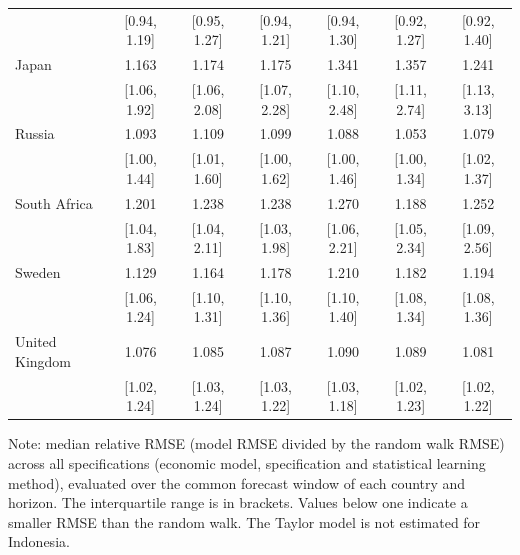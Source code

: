 \begin{table}[htbp]
{\begin{tabular*}{\textwidth}{@{\extracolsep{\fill}}lcccccc}
 & [0.94, 1.19] & [0.95, 1.27] & [0.94, 1.21] & [0.94, 1.30] & [0.92, 1.27] & [0.92, 1.40] \\
\addlinespace
Japan & 1.163 & 1.174 & 1.175 & 1.341 & 1.357 & 1.241 \\
 & [1.06, 1.92] & [1.06, 2.08] & [1.07, 2.28] & [1.10, 2.48] & [1.11, 2.74] & [1.13, 3.13] \\
\addlinespace
Russia & 1.093 & 1.109 & 1.099 & 1.088 & 1.053 & 1.079 \\
 & [1.00, 1.44] & [1.01, 1.60] & [1.00, 1.62] & [1.00, 1.46] & [1.00, 1.34] & [1.02, 1.37] \\
\addlinespace
South Africa & 1.201 & 1.238 & 1.238 & 1.270 & 1.188 & 1.252 \\
 & [1.04, 1.83] & [1.04, 2.11] & [1.03, 1.98] & [1.06, 2.21] & [1.05, 2.34] & [1.09, 2.56] \\
\addlinespace
Sweden & 1.129 & 1.164 & 1.178 & 1.210 & 1.182 & 1.194 \\
 & [1.06, 1.24] & [1.10, 1.31] & [1.10, 1.36] & [1.10, 1.40] & [1.08, 1.34] & [1.08, 1.36] \\
\addlinespace
United Kingdom & 1.076 & 1.085 & 1.087 & 1.090 & 1.089 & 1.081 \\
 & [1.02, 1.24] & [1.03, 1.24] & [1.03, 1.22] & [1.03, 1.18] & [1.02, 1.23] & [1.02, 1.22] \\
\bottomrule
\end{tabular*}
}
\par\noindent\begin{minipage}{\textwidth}
{\fontsize{8}{10}\selectfont Note: median relative RMSE (model RMSE divided by the random walk RMSE) across all specifications (economic model, specification and statistical learning method), evaluated over the common forecast window of each country and horizon. The interquartile range is in brackets. Values below one indicate a smaller RMSE than the random walk. The Taylor model is not estimated for Indonesia.}
\end{minipage}
\end{table}
